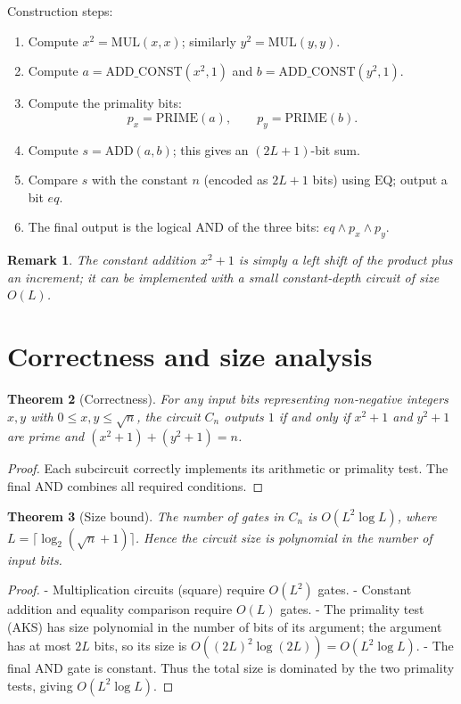 \documentclass[11pt,a4paper]{article}
\newtheorem{theorem}{Theorem}[section]
\newtheorem{remark}[theorem]{Remark}
\begin{document}
Construction steps:
\begin{enumerate}
\item Compute \(x^{2} = \mathrm{MUL}(x,x)\); similarly \(y^{2} = \mathrm{MUL}(y,y)\).
\item Compute \(a = \mathrm{ADD\_CONST}(x^{2}, 1)\) and \(b = \mathrm{ADD\_CONST}(y^{2}, 1)\).
\item Compute the primality bits:
   \[
   p_{x} = \mathrm{PRIME}(a),\qquad p_{y} = \mathrm{PRIME}(b).
   \]
\item Compute \(s = \mathrm{ADD}(a,b)\); this gives an \((2L+1)\)-bit sum.
\item Compare \(s\) with the constant \(n\) (encoded as \(2L+1\) bits) using \(\mathrm{EQ}\); output a bit \(eq\).
\item The final output is the logical AND of the three bits: \(eq \land p_{x} \land p_{y}\).
\end{enumerate}

\begin{remark}
The constant addition \(x^{2}+1\) is simply a left shift of the product plus an increment; it can be implemented with a small constant‑depth circuit of size \(O(L)\).
\end{remark}

\section{Correctness and size analysis}

\begin{theorem}[Correctness]
\label{thm:correct}
For any input bits representing non‑negative integers \(x,y\) with \(0\le x,y \le \sqrt{n}\), the circuit \(C_{n}\) outputs \(1\) if and only if \(x^{2}+1\) and \(y^{2}+1\) are prime and \((x^{2}+1)+(y^{2}+1) = n\).
\end{theorem}
\begin{proof}
Each subcircuit correctly implements its arithmetic or primality test. The final AND combines all required conditions.
\end{proof}

\begin{theorem}[Size bound]
\label{thm:size}
The number of gates in \(C_{n}\) is \(O(L^{2}\log L)\), where \(L = \lceil \log_{2}(\sqrt{n}+1)\rceil\). Hence the circuit size is polynomial in the number of input bits.
\end{theorem}
\begin{proof}
- Multiplication circuits (square) require \(O(L^{2})\) gates.
- Constant addition and equality comparison require \(O(L)\) gates.
- The primality test (AKS) has size polynomial in the number of bits of its argument; the argument has at most \(2L\) bits, so its size is \(O((2L)^{2}\log(2L)) = O(L^{2}\log L)\).
- The final AND gate is constant.
Thus the total size is dominated by the two primality tests, giving \(O(L^{2}\log L)\).
\end{proof}
\end{document}
